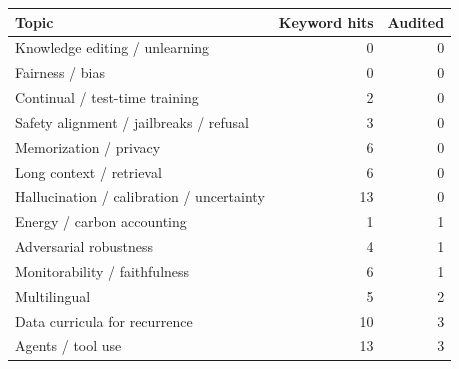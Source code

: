 \begin{tabular}{@{}lrr@{}}
\toprule
Topic & Keyword hits & Audited \\
\midrule
Knowledge editing / unlearning & 0 & 0 \\
Fairness / bias & 0 & 0 \\
Continual / test-time training & 2 & 0 \\
Safety alignment / jailbreaks / refusal & 3 & 0 \\
Memorization / privacy & 6 & 0 \\
Long context / retrieval & 6 & 0 \\
Hallucination / calibration / uncertainty & 13 & 0 \\
Energy / carbon accounting & 1 & 1 \\
Adversarial robustness & 4 & 1 \\
Monitorability / faithfulness & 6 & 1 \\
Multilingual & 5 & 2 \\
Data curricula for recurrence & 10 & 3 \\
Agents / tool use & 13 & 3 \\
\bottomrule
\end{tabular}

